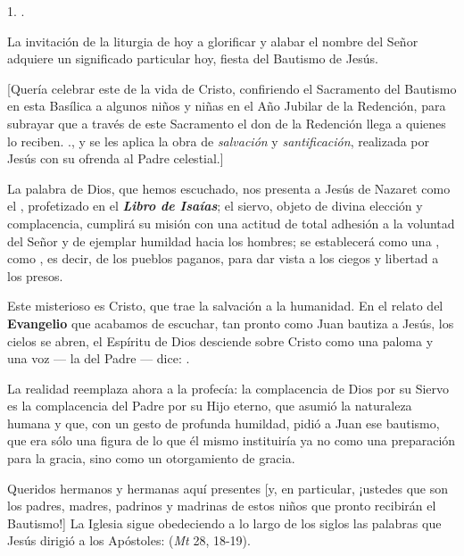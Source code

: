 				\begin{body}
					1. .
					
					La invitación de la liturgia de hoy a glorificar y alabar el nombre del Señor adquiere un significado particular hoy, fiesta del Bautismo de Jesús.
					
					{[}Quería celebrar este  de la vida de Cristo, confiriendo el Sacramento del Bautismo en esta Basílica a algunos niños y niñas en el Año Jubilar de la Redención, para subrayar que a través de este Sacramento el don de la Redención llega a quienes lo reciben. ., y se les aplica la obra de \emph{salvación} y \emph{santificación}, realizada por Jesús con su ofrenda al Padre celestial.{]}
					
					La palabra de Dios, que hemos escuchado, nos presenta a Jesús de Nazaret como el , profetizado en el \emph{\textbf{Libro de Isaías}}; el siervo, objeto de divina elección y complacencia, cumplirá su misión con una actitud de total adhesión a la voluntad del Señor y de ejemplar humildad hacia los hombres; se establecerá como una , como , es decir, de los pueblos paganos, para dar vista a los ciegos y libertad a los presos.
					
					Este misterioso  es Cristo, que trae la salvación a la humanidad. En el relato del \textbf{Evangelio} que acabamos de escuchar, tan pronto como Juan bautiza a Jesús, los cielos se abren, el Espíritu de Dios desciende sobre Cristo como una paloma y una voz --- la del Padre --- dice: .
					
					La realidad reemplaza ahora a la profecía: la complacencia de Dios por su Siervo es la complacencia del Padre por su Hijo eterno, que asumió la naturaleza humana y que, con un gesto de profunda humildad, pidió a Juan ese bautismo, que era sólo una figura de lo que él mismo instituiría ya no como una preparación para la gracia, sino como un otorgamiento de gracia.
					
					Queridos hermanos y hermanas aquí presentes {[}y, en particular, ¡ustedes que son los padres, madres, padrinos y madrinas de estos niños que pronto recibirán el Bautismo!{]} La Iglesia sigue obedeciendo a lo largo de los siglos las palabras que Jesús dirigió a los Apóstoles:  (\emph{Mt} 28, 18-19).
					

\end{body}
